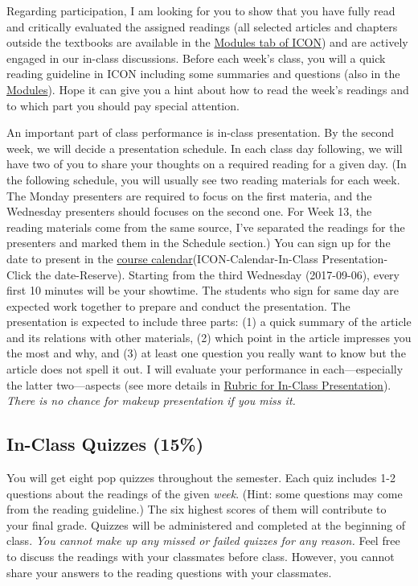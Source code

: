 \documentclass[11pt,]{article}
\theoremstyle{definition}
\theoremstyle{definition}
\theoremstyle{definition}
\theoremstyle{remark}
\begin{document}
Regarding participation, I am looking for you to show that you have
fully read and critically evaluated the assigned readings (all selected
articles and chapters outside the textbooks are available in the
\href{https://uiowa.instructure.com/courses/65855/modules}{Modules tab
of ICON}) and are actively engaged in our in-class discussions. Before
each week's class, you will a quick reading guideline in ICON including
some summaries and questions (also in the
\href{(https://uiowa.instructure.com/courses/65855/modules)}{Modules}).
Hope it can give you a hint about how to read the week's readings and to
which part you should pay special attention.

An important part of class performance is in-class presentation. By the
second week, we will decide a presentation schedule. In each class day
following, we will have two of you to share your thoughts on a required
reading for a given day. (In the following schedule, you will usually
see two reading materials for each week. The Monday presenters are
required to focus on the first materia, and the Wednesday presenters
should focuses on the second one. For Week 13, the reading materials
come from the same source, I've separated the readings for the
presenters and marked them in the Schedule section.) You can sign up for
the date to present in the
\href{https://uiowa.instructure.com/calendar\#view_name=scheduler\&view_start=2017-08-30\&appointment_group_id=195}{course
calendar}(ICON-Calendar-In-Class Presentation-Click the date-Reserve).
Starting from the third Wednesday (2017-09-06), every first 10 minutes
will be your showtime. The students who sign for same day are expected
work together to prepare and conduct the presentation. The presentation
is expected to include three parts: (1) a quick summary of the article
and its relations with other materials, (2) which point in the article
impresses you the most and why, and (3) at least one question you really
want to know but the article does not spell it out. I will evaluate your
performance in each---especially the latter two---aspects (see more
details in \protect\hyperlink{id}{Rubric for In-Class Presentation}).
\emph{There is no chance for makeup presentation if you miss it.}

\subsection{In-Class Quizzes (15\%)}\label{in-class-quizzes-15}

You will get eight pop quizzes throughout the semester. Each quiz
includes 1-2 questions about the readings of the given \emph{week}.
(Hint: some questions may come from the reading guideline.) The six
highest scores of them will contribute to your final grade. Quizzes will
be administered and completed at the beginning of class. \emph{You
cannot make up any missed or failed quizzes for any reason.} Feel free
to discuss the readings with your classmates before class. However, you
cannot share your answers to the reading questions with your classmates.
\end{document}
